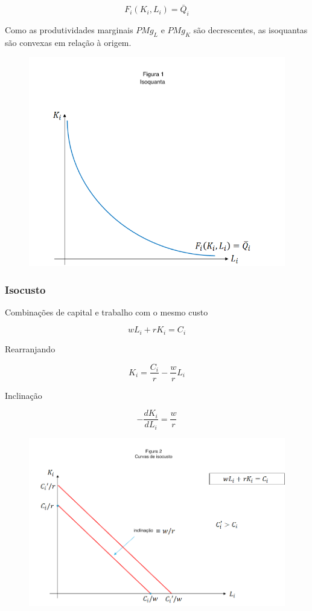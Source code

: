\documentclass[a4paper,12pt]{article}[abntex2]
\begin{document}
\[
F_i(K_i, L_i) = \bar{Q}_i
\]

Como as produtividades marginais \( PMg_L \) e \( PMg_K \) são decrescentes, as isoquantas são convexas em relação à origem.

\begin{figure}[H]
    \centering
    \includegraphics[width=0.7\linewidth]{Imagens/a10i1.png}
\end{figure}

\subsubsection{\textbf{Isocusto}}

Combinações de capital e trabalho com o mesmo custo

\[
wL_i + rK_i = C_i
\]

Rearranjando

\[
K_i = \frac{C_i}{r} - \frac{w}{r} L_i
\]

Inclinação

\[
-\frac{dK_i}{dL_i} = \frac{w}{r}
\]

\begin{figure}[H]
    \centering
    \includegraphics[width=0.7\linewidth]{Imagens/a10i2.png}
\end{figure}
\end{document}
